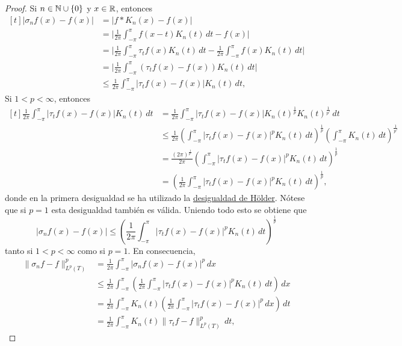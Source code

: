 \documentclass[a4paper, 11pt, oneside]{report}
\begin{document}
\begin{proof}
  Si $n \in \mathbb N \cup \{0\}$ y $x \in \mathbb R$, entonces
  \[
  \begin{aligned}[t]
    |\sigma_nf(x)-f(x)| &= |f \ast K_n(x) - f(x) | \\
    &= \biggl|\frac{1}{2\pi}\int_{-\pi}^\pi f(x-t)K_n(t) \, dt - f(x)\biggr| \\
    &= \biggl|\frac{1}{2\pi}\int_{-\pi}^\pi \tau_tf(x) K_n(t) \, dt - \frac{1}{2\pi}\int_{-\pi}^\pi f(x)K_n(t) \, dt \biggr| \\
    &= \biggl|\frac{1}{2\pi}\int_{-\pi}^\pi (\tau_tf(x)-f(x))K_n(t) \, dt \biggr| \\
    &\leq \frac{1}{2\pi}\int_{-\pi}^\pi |\tau_tf(x) - f(x)|K_n(t) \, dt,
  \end{aligned}
  \]
  Si $1 < p < \infty$, entonces
  \[\begin{aligned}[t]
    \frac{1}{2\pi}\int_{-\pi}^\pi |\tau_tf(x) - f(x)|K_n(t) \, dt &= \frac{1}{2\pi}\int_{-\pi}^\pi |\tau_tf(x) - f(x)|K_n(t)^{\frac{1}{p}}K_n(t)^{\frac{1}{p'}} \, dt \\
    &\leq \frac{1}{2\pi}\left(\int_{-\pi}^\pi |\tau_tf(x) - f(x)|^p K_n(t) \, dt\right)^{\frac{1}{p}}\left(\int_{-\pi}^\pi K_n(t) \, dt\right)^{\frac{1}{p'}} \\
    &= \frac{(2\pi)^{\frac{1}{p'}}}{2\pi}\left(\int_{-\pi}^\pi |\tau_tf(x) - f(x)|^p K_n(t) \, dt\right)^{\frac{1}{p}} \\
    &= \left(\frac{1}{2\pi}\int_{-\pi}^\pi |\tau_tf(x) - f(x)|^p K_n(t) \, dt\right)^{\frac{1}{p}},
  \end{aligned}\]
  donde en la primera desigualdad se ha utilizado la \hyperref[teo:1.2.6]{\color{c1}desigualdad de Hölder}. Nótese que si $p = 1$ esta desigualdad también es válida. Uniendo todo esto se obtiene que
  \[|\sigma_nf(x) - f(x)| \leq \left(\frac{1}{2\pi}\int_{-\pi}^\pi |\tau_tf(x) - f(x)|^p K_n(t) \, dt\right)^{\frac{1}{p}}\]
  tanto si $1 < p < \infty$ como si $p = 1$. En consecuencia,
  \begin{align*}
    \|\sigma_nf-f\|_{L^p(T)}^p &= \frac{1}{2\pi}\int_{-\pi}^\pi |\sigma_nf(x)-f(x)|^p \, dx \\
    &\leq \frac{1}{2\pi}\int_{-\pi}^\pi \left(\frac{1}{2\pi}\int_{-\pi}^\pi |\tau_tf(x) - f(x)|^p K_n(t) \, dt\right) \, dx \\
    &= \frac{1}{2\pi}\int_{-\pi}^\pi K_n(t)\left( \frac{1}{2\pi}\int_{-\pi}^\pi |\tau_tf(x)-f(x)|^p \, dx\right) \, dt \\
    &= \frac{1}{2\pi}\int_{-\pi}^\pi K_n(t) \|\tau_tf-f\|_{L^p(T)}^p \, dt, \tag{$\ast$}

\end{align*}
\end{proof}
\end{document}

